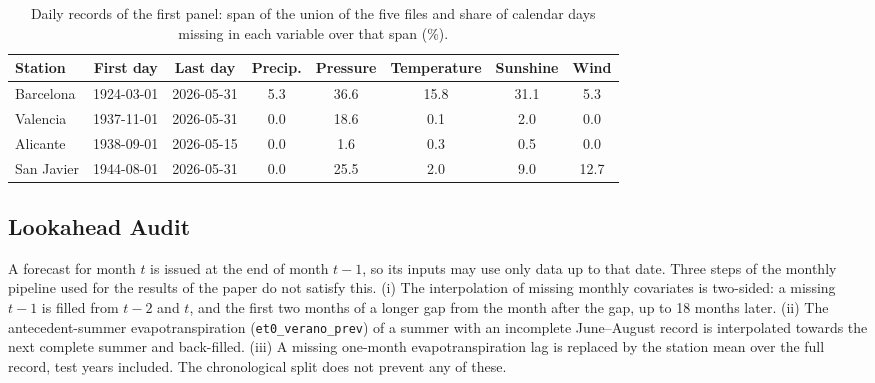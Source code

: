 \documentclass[11pt,a4paper]{article}
\begin{document}
\begin{table}[htbp]
\centering
\caption{Daily records of the first panel: span of the union of the five files and share of calendar days missing in each variable over that span (\%).}
\label{tab:etl}
{\small
\begin{tabular}{lccccccc}
\toprule
\textbf{Station} & \textbf{First day} & \textbf{Last day} & \textbf{Precip.} & \textbf{Pressure} & \textbf{Temperature} & \textbf{Sunshine} & \textbf{Wind} \\
\midrule
Barcelona & 1924-03-01 & 2026-05-31 & 5.3 & 36.6 & 15.8 & 31.1 & 5.3 \\
Valencia & 1937-11-01 & 2026-05-31 & 0.0 & 18.6 & 0.1 & 2.0 & 0.0 \\
Alicante & 1938-09-01 & 2026-05-15 & 0.0 & 1.6 & 0.3 & 0.5 & 0.0 \\
San Javier & 1944-08-01 & 2026-05-31 & 0.0 & 25.5 & 2.0 & 9.0 & 12.7 \\
\bottomrule
\end{tabular}}
\end{table}

\subsection{Lookahead Audit}
\label{sec:lookahead}

A forecast for month $t$ is issued at the end of month $t-1$, so its inputs may use only data up to that date. Three steps of the monthly pipeline used for the results of the paper do not satisfy this. (i) The interpolation of missing monthly covariates is two-sided: a missing $t-1$ is filled from $t-2$ and $t$, and the first two months of a longer gap from the month after the gap, up to 18 months later. (ii) The antecedent-summer evapotranspiration (\texttt{et0\_verano\_prev}) of a summer with an incomplete June--August record is interpolated towards the next complete summer and back-filled. (iii) A missing one-month evapotranspiration lag is replaced by the station mean over the full record, test years included. The chronological split does not prevent any of these.
\end{document}
